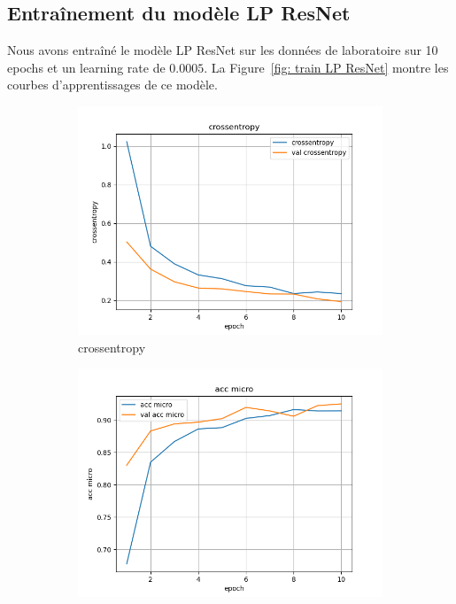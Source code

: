 \documentclass[a4paper]{article}
\begin{document}
\subsection{Entraînement du modèle LP ResNet}
Nous avons entraîné le modèle LP ResNet sur les données de laboratoire sur 10 epochs et un learning rate de $0.0005$. La Figure~\ref{fig: train LP ResNet} montre les courbes d'apprentissages de ce modèle.

\begin{figure}[ht]
    \centering
    \begin{subfigure}{0.32\textwidth}
        \centering
        \includegraphics[width=\linewidth]{../logs/resnet_img256_0/crossentropy.png}
        \caption{crossentropy}
    \end{subfigure}
    \begin{subfigure}{0.32\textwidth}
        \centering
        \includegraphics[width=\linewidth]{../logs/resnet_img256_0/acc micro.png}

\end{subfigure}
\end{figure}
\end{document}
